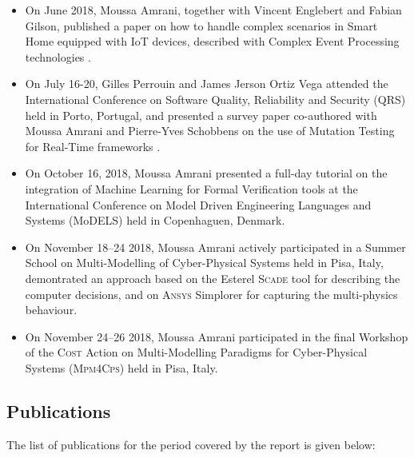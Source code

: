 \begin{itemize}
   \item On June 2018, Moussa Amrani, together with Vincent Englebert and 
Fabian Gilson, published a paper on how to handle complex scenarios in Smart 
Home equipped with IoT devices, described with Complex Event Processing 
technologies \cite{Amrani-Gilson-Englebert:2017}.

   \item On July 16-20, Gilles Perrouin and James Jerson Ortiz Vega attended 
the International Conference on Software Quality, Reliability and Security 
(QRS) held in Porto, Portugal, and presented a survey paper co-authored with 
Moussa Amrani and Pierre-Yves Schobbens on the use of Mutation Testing for 
Real-Time frameworks \cite{OrtizVega-Perrouin-Amrani-Schobbens:2018}.

   \item On October 16, 2018, Moussa Amrani presented a full-day tutorial on 
the integration of Machine Learning for Formal Verification tools at the 
International Conference on Model Driven Engineering Languages and Systems 
(MoDELS) held in Copenhaguen, Denmark.

   \item On November 18--24 2018, Moussa Amrani actively participated in a 
Summer School on Multi-Modelling of Cyber-Physical Systems held in Pisa, Italy, 
demontrated an approach based on the Esterel \textsc{Scade} tool for describing 
the computer decisions, and on \textsc{Ansys} Simplorer for capturing the 
multi-physics behaviour.

   \item On November 24--26 2018, Moussa Amrani participated in the final 
Workshop of the \textsc{Cost} Action on Multi-Modelling Paradigms for 
Cyber-Physical Systems (\textsc{Mpm4Cps}) held in Pisa, Italy.
\end{itemize}



\subsection{Publications}
\label{sec:Publications}

The list of publications for the period covered by the report is given below: 

\nocite{*}
\printbibliography[heading={none}]
